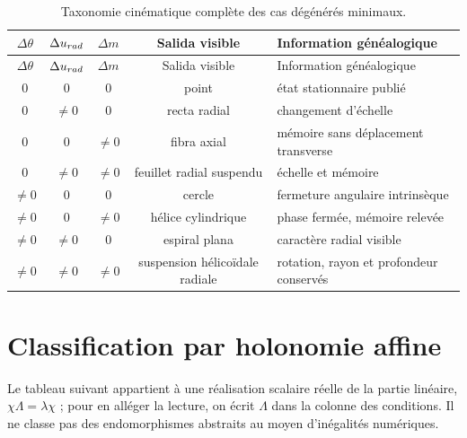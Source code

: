\begin{longtable}{ccccl}
\caption{Taxonomie cinématique complète des cas dégénérés minimaux.}
\label{espiral:tab:taxonomia-cinematica-ap}\\
\toprule
\(\Delta\theta\)&\(\Delta u_{rad}\)&\(\Delta m\)&Salida visible&
Information généalogique\\
\midrule
\endfirsthead
\toprule
\(\Delta\theta\)&\(\Delta u_{rad}\)&\(\Delta m\)&Salida visible&
Information généalogique\\
\midrule
\endhead
\(0\)&\(0\)&\(0\)&point&état stationnaire publié\\
\(0\)&\(\neq0\)&\(0\)&recta radial&changement d'échelle\\
\(0\)&\(0\)&\(\neq0\)&fibra axial&mémoire sans déplacement transverse\\
\(0\)&\(\neq0\)&\(\neq0\)&feuillet radial suspendu&échelle et mémoire\\
\(\neq0\)&\(0\)&\(0\)&cercle&fermeture angulaire intrinsèque\\
\(\neq0\)&\(0\)&\(\neq0\)&hélice cylindrique&phase fermée, mémoire relevée\\
\(\neq0\)&\(\neq0\)&\(0\)&espiral plana&caractère radial visible\\
\(\neq0\)&\(\neq0\)&\(\neq0\)&suspension hélicoïdale radiale&rotation, rayon et profondeur conservés\\
\bottomrule
\end{longtable}

\section{Classification par holonomie affine}

Le tableau suivant appartient à une réalisation scalaire réelle de la partie linéaire, \(\chi\Lambda=\lambda\chi\) ; pour en alléger la lecture, on écrit \(\Lambda\) dans la colonne des conditions. Il ne classe pas des endomorphismes abstraits au moyen d'inégalités numériques.

